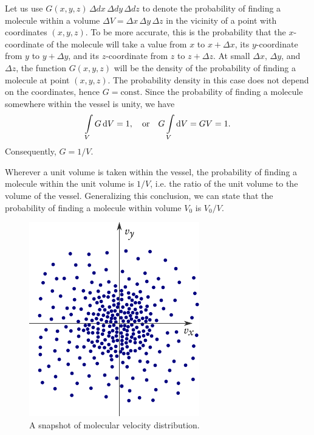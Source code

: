Let us use $G (x, y, z) \, \Delta dx \, \Delta dy\, \Delta dz$ to denote the probability of finding a molecule within a volume $ \Delta V = \Delta x \, \Delta y \, \Delta z$ in the vicinity of a point with coordinates $(x, y, z)$. To be more accurate, this is the probability that the $x$-coordinate of the molecule will take a value from $x$ to $x + \Delta x$, its $y$-coordinate from $y$ to $y + \Delta y$, and its $z$-coordinate from $z$ to $z + \Delta z$. At small $ \Delta x, \, \Delta y$, and $ \Delta z$, the function $G(x, y, z)$ will be the density of the probability of finding a molecule at point $(x, y, z)$. The probability density in this case does not depend on the coordinates, hence $G = \text{const}$. Since the probability of finding a molecule somewhere within the vessel is unity, we have
\begin{equation*}%
\int\limits_{V} G \, \dd V =1,  \qor  G \int\limits_{V}  \dd V = GV = 1.
\end{equation*}
Consequently, $G = 1/V$. 

Wherever a unit volume is taken within the vessel, the probability of finding a molecule within the unit volume is $1/V$, i.e. the ratio of the unit volume to the volume of the vessel. Generalizing this conclusion, we can state that the probability of finding a molecule within volume $V_{0}$ is $V_{0}/V$.

\begin{figure}
\centering
\includegraphics[width=\linewidth]{figures/mol-dist.pdf}
\caption{A snapshot of molecular velocity distribution.}
\label{mol-dist}
\end{figure}

